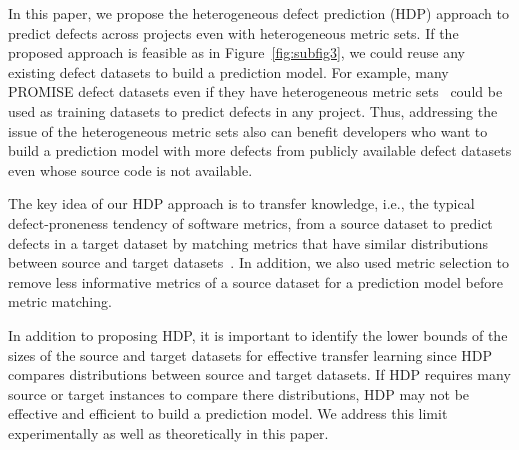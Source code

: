 %





In this paper, we propose the heterogeneous defect prediction (HDP) approach
to predict defects across projects even with heterogeneous metric
sets.
If the proposed approach is feasible as in
Figure~\ref{fig:subfig3}, we could reuse any existing defect
datasets to build a prediction model. For example, many PROMISE defect datasets
even if they have heterogeneous metric sets~\cite{promise12} could be used as
training datasets to predict defects in any project.
Thus, addressing the issue of the heterogeneous metric sets also can benefit developers who want to build a prediction model with more defects from publicly available defect datasets even whose source code is not available.

The key idea of our HDP approach is to transfer knowledge, i.e., the typical defect-proneness tendency of software metrics, from a source dataset to predict defects in a target dataset by matching metrics that have
similar distributions between source and target datasets~\cite{Bird2011,DAmbros12,Menzies07,Ohlsson1996,Rahman13}. In addition, we also
used metric selection to remove less informative metrics of a source dataset
for a prediction model before metric matching.

In addition to proposing HDP, it is important to identify the lower bounds of the sizes of the source and target datasets for effective transfer learning since HDP compares distributions between source and target datasets.
If HDP requires many source or target instances to compare there distributions, HDP may not be effective and efficient to build a prediction model. We address this limit experimentally as well as theoretically in this paper.


